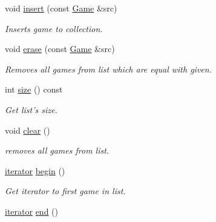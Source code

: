 \begin{DoxyCompactItemize}
\item 
void \hyperlink{classpgn_1_1GameCollection_a9b2413202a318ac4c3a6cfc15de6bc80}{insert} (const \hyperlink{classpgn_1_1Game}{Game} \&src)
\begin{DoxyCompactList}\small\item\em Inserts game to collection. \item\end{DoxyCompactList}\item 
void \hyperlink{classpgn_1_1GameCollection_ad67e7d44f86a1418dc49bb7b70cf2b27}{erase} (const \hyperlink{classpgn_1_1Game}{Game} \&src)
\begin{DoxyCompactList}\small\item\em Removes all games from list which are equal with given. \item\end{DoxyCompactList}\item 
\hypertarget{classpgn_1_1GameCollection_ab757128add0a1eea0552c717b192b855}{
int \hyperlink{classpgn_1_1GameCollection_ab757128add0a1eea0552c717b192b855}{size} () const }
\label{classpgn_1_1GameCollection_ab757128add0a1eea0552c717b192b855}

\begin{DoxyCompactList}\small\item\em Get list's size. \item\end{DoxyCompactList}\item 
\hypertarget{classpgn_1_1GameCollection_a33422209359d7130e3b3a95128308e47}{
void \hyperlink{classpgn_1_1GameCollection_a33422209359d7130e3b3a95128308e47}{clear} ()}
\label{classpgn_1_1GameCollection_a33422209359d7130e3b3a95128308e47}

\begin{DoxyCompactList}\small\item\em removes all games from list. \item\end{DoxyCompactList}\item 
\hypertarget{classpgn_1_1GameCollection_aa996049df90b5f0a3749e756c4517456}{
\hyperlink{classpgn_1_1GameCollection_1_1iterator}{iterator} \hyperlink{classpgn_1_1GameCollection_aa996049df90b5f0a3749e756c4517456}{begin} ()}
\label{classpgn_1_1GameCollection_aa996049df90b5f0a3749e756c4517456}

\begin{DoxyCompactList}\small\item\em Get iterator to first game in list. \item\end{DoxyCompactList}\item 
\hypertarget{classpgn_1_1GameCollection_aa72ad755b92ce65787447720dfcfe293}{
\hyperlink{classpgn_1_1GameCollection_1_1iterator}{iterator} \hyperlink{classpgn_1_1GameCollection_aa72ad755b92ce65787447720dfcfe293}{end} ()}
\label{classpgn_1_1GameCollection_aa72ad755b92ce65787447720dfcfe293}


\end{DoxyCompactItemize}
